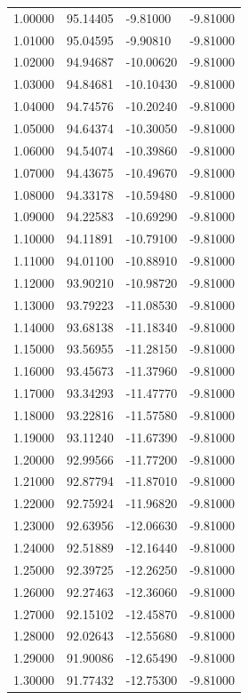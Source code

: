 \begin{table}
\begin{tabular}{llll}
1.00000 & 95.14405 & -9.81000 & -9.81000 \\
1.01000 & 95.04595 & -9.90810 & -9.81000 \\
1.02000 & 94.94687 & -10.00620 & -9.81000 \\
1.03000 & 94.84681 & -10.10430 & -9.81000 \\
1.04000 & 94.74576 & -10.20240 & -9.81000 \\
1.05000 & 94.64374 & -10.30050 & -9.81000 \\
1.06000 & 94.54074 & -10.39860 & -9.81000 \\
1.07000 & 94.43675 & -10.49670 & -9.81000 \\
1.08000 & 94.33178 & -10.59480 & -9.81000 \\
1.09000 & 94.22583 & -10.69290 & -9.81000 \\
1.10000 & 94.11891 & -10.79100 & -9.81000 \\
1.11000 & 94.01100 & -10.88910 & -9.81000 \\
1.12000 & 93.90210 & -10.98720 & -9.81000 \\
1.13000 & 93.79223 & -11.08530 & -9.81000 \\
1.14000 & 93.68138 & -11.18340 & -9.81000 \\
1.15000 & 93.56955 & -11.28150 & -9.81000 \\
1.16000 & 93.45673 & -11.37960 & -9.81000 \\
1.17000 & 93.34293 & -11.47770 & -9.81000 \\
1.18000 & 93.22816 & -11.57580 & -9.81000 \\
1.19000 & 93.11240 & -11.67390 & -9.81000 \\
1.20000 & 92.99566 & -11.77200 & -9.81000 \\
1.21000 & 92.87794 & -11.87010 & -9.81000 \\
1.22000 & 92.75924 & -11.96820 & -9.81000 \\
1.23000 & 92.63956 & -12.06630 & -9.81000 \\
1.24000 & 92.51889 & -12.16440 & -9.81000 \\
1.25000 & 92.39725 & -12.26250 & -9.81000 \\
1.26000 & 92.27463 & -12.36060 & -9.81000 \\
1.27000 & 92.15102 & -12.45870 & -9.81000 \\
1.28000 & 92.02643 & -12.55680 & -9.81000 \\
1.29000 & 91.90086 & -12.65490 & -9.81000 \\
1.30000 & 91.77432 & -12.75300 & -9.81000 \\

\end{tabular}
\end{table}
